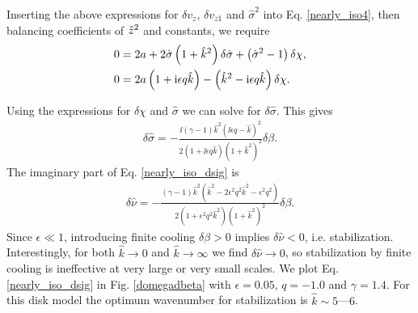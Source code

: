 Inserting the above expressions for $\delta v_z$, $\delta v_{z1}$ and
$\hat{\sigma}^2$ into Eq. \ref{nearly_iso4}, then balancing
coefficients of $\hat{z}^2$ and constants, we require
\begin{align}
0 &= 2a + 2\hat{\sigma}\left(1+\hat{k}^2\right)\delta\hat{\sigma} +
\left(\hat{\sigma}^2 -1\right)\delta\chi,\notag\\
0&= 2a\left(1+\mathrm{i}\epsilon q \hat{k}\right) - \left(\hat{k}^2 - \mathrm{i}\epsilon
q \hat{k}\right)\delta\chi.
\end{align} 

Using the expressions for $\delta\chi$ and $\hat{\sigma}$ we can solve
for $\delta\hat{\sigma}$. This gives 
\begin{align}\label{nearly_iso_dsig}
  \delta \hat{\sigma} =
  -\frac{\ii\left(\gamma-1\right)\hat{k}^2\left(\ii\epsilon
      q - \hat{k}\right)^2}{2\left(1+\ii\epsilon q \hat{k}\right)\left(1+\hat{k}^2\right)^2}\delta\beta.
\end{align}
The imaginary part of Eq. \ref{nearly_iso_dsig} is
\begin{align}
  \delta\hat{\nu} =
  -\frac{\left(\gamma-1\right)\hat{k}^2 \left(\hat{k}^2 -
      2\epsilon^2q^2\hat{k}^2 - \epsilon^2q^2\right)}{2\left(1+\epsilon^2 q^2
      \hat{k}^2\right)\left(1+\hat{k}^2\right)^2}\delta\beta.  
\end{align}
Since $\epsilon \ll 1$, introducing finite cooling $\delta\beta>0$
implies $\delta\hat{\nu} < 0$, i.e. stabilization. Interestingly, for both
$\hat{k}\to0$ and $\hat{k}\to\infty$ we find $\delta\hat{\nu}\to0$, so
stabilization by finite cooling is ineffective at very large or very
small scales. We plot Eq. \ref{nearly_iso_dsig} in Fig. \ref{domegadbeta} with
$\epsilon=0.05$, $q=-1.0$ and $\gamma=1.4$. For this disk model the
optimum wavenumber for stabilization is $\hat{k}\sim 5$---$6$.  


